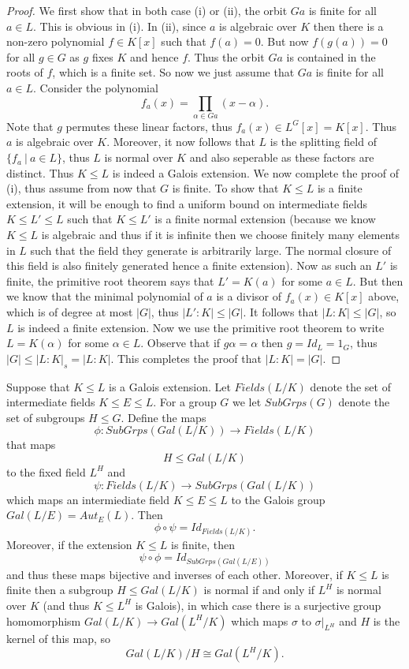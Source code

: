 \documentclass[twoside, a4paper, 10pt]{amsart}
\begin{document}
\begin{proof} We first show that in  both case (i) or (ii), the orbit $Ga$ is finite for all $a \in L$. This is obvious in (i). In (ii), since $a$ is algebraic over $K$ then there is a non-zero polynomial $f \in K[x]$ such that $f(a) = 0$. But now $f(g(a)) = 0$ for all $g \in G$ as $g$ fixes $K$ and hence $f$. Thus the orbit $Ga$ is contained in the roots of $f$, which is a finite set. So now we just assume that $Ga$ is finite for all $a \in L$. Consider the polynomial $$f_a(x) = \prod_{\alpha \in Ga} (x - \alpha).$$ Note that $g$ permutes these linear factors, thus $f_a(x) \in L^G[x] = K[x]$. Thus $a$ is algebraic over $K$. Moreover, it now follows that $L$ is the splitting field of $\{f_a ~|~ a \in L\}$, thus $L$ is normal over $K$ and also seperable as these factors are distinct. Thus $K \leq L$ is indeed a Galois extension.  We now complete the proof of (i), thus assume from now that $G$ is finite. To show that $K \leq L$ is a finite extension, it will be enough to find a uniform bound on intermediate fields $K \leq L' \leq L$ such that $K \leq L'$ is a finite normal extension (because we know $K \leq L$ is algebraic and thus if it is infinite then we choose finitely many elements in $L$ such that the field they generate is arbitrarily large. The normal closure of this field is also finitely generated hence a finite extension). Now as such an $L'$ is finite, the primitive root theorem says that $L' = K(a)$ for some $a \in L$. But then we know that the minimal polynomial of $a$ is a divisor of $f_a(x) \in K[x]$ above, which is of degree at most $|G|$, thus $|L':K| \leq |G|$. It follows that $|L:K| \leq |G|$, so $L$ is indeed a finite extension. Now we use the primitive root theorem to write $L = K(\alpha)$ for some $\alpha \in L$. Observe that if $g \alpha = \alpha$ then $g = Id_L = 1_G$, thus $|G| \leq |L:K|_s = |L:K|$. This completes the proof that $|L:K| = |G|$. \end{proof}

\begin{thm} Suppose that $K \leq L$ is a Galois extension. Let $Fields(L/K)$ denote the set of intermediate fields $K \leq E \leq L$. For a group $G$ we let $SubGrps(G)$ denote the set of subgroups $H \leq G$. Define the maps $$\phi: SubGrps(Gal(L/K)) \to Fields(L/K)$$ that maps $$H \leq Gal(L/K)$$ to the fixed field $L^H$ and $$\psi:Fields(L/K) \to SubGrps(Gal(L/K)) $$ which maps an intermiediate field $K \leq E \leq L$ to the Galois group $Gal(L/E) = Aut_E(L)$. Then $$\phi \circ \psi = Id_{Fields(L/K)}.$$ Moreover, if the extension $K \leq L$ is finite, then $$\psi \circ \phi = Id_{SubGrps(Gal(L/E))}$$ and thus these maps bijective and inverses of each other. Moreover, if $K \leq L$ is finite then a subgroup $H \leq Gal(L/K)$ is normal if and only if $L^H$ is normal over $K$ (and thus $K \leq L^H$ is Galois), in which case there is a surjective group homomorphism $Gal(L/K) \to Gal(L^H/K)$ which maps $\sigma$ to $\sigma|_{L^H}$ and $H$ is the kernel of this map, so $$Gal(L/K)/H \cong Gal(L^H/K).$$

\end{thm}
\end{document}
